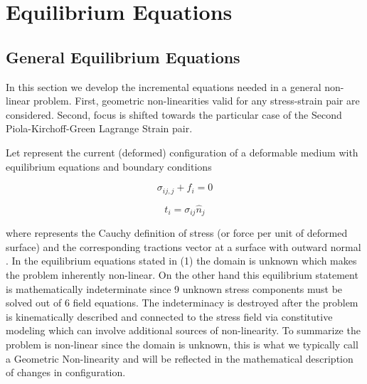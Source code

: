 %
\chapter{Equilibrium Equations}

\section{General Equilibrium Equations}
In this section we develop the incremental equations needed in a general non-linear problem.  First, geometric non-linearities valid for any stress-strain pair are considered.  Second, focus is shifted towards the particular case of the Second Piola-Kirchoff-Green Lagrange Strain pair.

Let   represent the current (deformed) configuration of a deformable medium with equilibrium equations and boundary conditions

\begin{equation}
{\sigma _{ij,j}} + {f_i} = 0	 
\end{equation}			

\begin{equation}
{t_i} = {\sigma _{ij}}{\hat n_j}
\end{equation}	 		

where   represents the Cauchy definition of stress (or force per unit of deformed surface) and   the corresponding tractions vector at a surface with outward normal  .  In the equilibrium equations stated in (1) the domain   is unknown which makes the problem inherently non-linear.  On the other hand this equilibrium statement is mathematically indeterminate since 9 unknown stress components must be solved out of 6 field equations.  The indeterminacy is destroyed after the problem is kinematically described and connected to the stress field via constitutive modeling which can involve additional sources of non-linearity.  To summarize the problem is non-linear since the domain   is unknown, this is what we typically call a Geometric Non-linearity and will be reflected in the mathematical description of changes in configuration.



